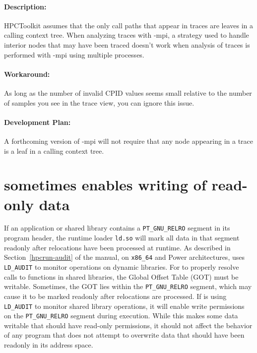 \documentclass[11pt,twoside,letterpaper]{report}
\begin{document}
\paragraph{Description:} HPCToolkit assumes that the only call paths that appear in traces are leaves in a calling context tree. When analyzing traces with \hpcprof-mpi{}, a strategy used to handle interior nodes that may have been traced doesn't work when analysis of traces is performed with \hpcprof-mpi{} using multiple processes. 

\paragraph{Workaround:} As long as the number of invalid CPID values seems small relative to the number of samples you see in the trace view, you can ignore this issue. 

\paragraph{Development Plan:} A forthcoming version of \hpcprof-mpi{} will not require that any node appearing in a trace is a leaf in a calling context tree.

\section{\hpcrun{} sometimes enables writing of read-only data}

If an application or shared library contains a \verb|PT_GNU_RELRO| segment in its program header, the runtime loader \verb|ld.so| will mark all data in that segment readonly
after relocations have been processed at runtime. 
As described in Section~\ref{hpcrun-audit} of the manual, on \verb|x86_64| and Power architectures, \hpcrun{} uses \verb|LD_AUDIT| to monitor operations on dynamic libraries. 
For \hpcrun{} to properly resolve calls to functions in shared libraries, the Global Offset Table (GOT) must be writable. Sometimes, the GOT lies within the \verb|PT_GNU_RELRO| segment, which may cause it to be marked readonly after relocations are processed.
If \hpcrun{} is using   \verb|LD_AUDIT| to monitor shared library operations, it will enable write permissions on the \verb|PT_GNU_RELRO| segment during execution. While this makes some data writable that should have read-only permissions, it should not affect the behavior of any program that does not attempt to overwrite data that should have been readonly in its address space.
\end{document}
